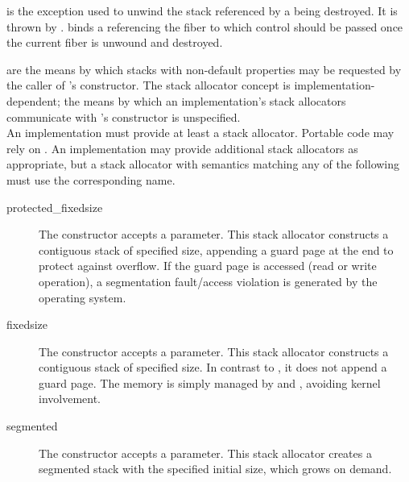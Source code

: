 is the exception used to unwind the stack referenced by a \fiber being destroyed.
It is thrown by \unwindfib. \unwindex binds a \fiber referencing the fiber to
which control should be passed once the current fiber is unwound and destroyed.


\label{stackalloc}

are the means by which stacks with non-default properties may be requested by
the caller of \fiber's constructor. The stack allocator concept is
implementation-dependent; the means by which an implementation's
stack allocators communicate with \fiber's constructor is unspecified.\\

An implementation must provide at least a  stack allocator.
Portable code may rely on . An implementation may provide
additional stack allocators as appropriate, but a stack allocator with
semantics matching any of the following must use the corresponding name.
\begin{description}
  \item[protected\_fixedsize] The constructor accepts a  parameter.
        This stack allocator constructs a contiguous stack of specified size,
        appending a guard page at the end to protect against overflow. If the
        guard page is accessed (read or write operation), a segmentation
        fault/access violation is generated by the operating system.
  \item[fixedsize] The constructor accepts a  parameter.
        This stack allocator constructs a contiguous stack of specified size.
        In contrast to , it does not append a guard
        page. The memory is simply managed by 
        and , avoiding kernel involvement.
  \item[segmented] The constructor accepts a  parameter.
        This stack allocator creates a segmented stack\cite{gccsplit} with the
        specified initial size, which grows on demand.
\end{description}
